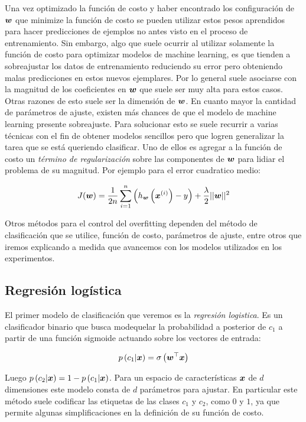 Una vez optimizado la función de costo y haber encontrado los configuración de
$\boldsymbol{w}$ que minimize la función de costo se pueden utilizar estos pesos
aprendidos para hacer predicciones de ejemplos no antes visto en el proceso de
entrenamiento. Sin embargo, algo que suele ocurrir al utilizar solamente la
función de costo para optimizar modelos de machine learning, es que tienden a
sobreajustar los datos de entrenamiento reduciendo su error pero obteniendo
malas predicciones en estos nuevos ejemplares. Por lo general suele asociarse
con la magnitud de los coeficientes en $\boldsymbol{w}$ que suele ser muy alta para
estos casos. Otras razones de esto suele ser la dimensión de $\boldsymbol{w}$. En
cuanto mayor la cantidad de parámetros de ajuste, existen más chances de que el
modelo de machine learning presente sobreajuste. Para solucionar esto se suele
recurrir a varias técnicas con el fin de obtener modelos sencillos pero que
logren generalizar la tarea que se está queriendo clasificar. Uno de ellos es
agregar a la función de costo un \emph{término de regularización} sobre las
componentes de $\boldsymbol{w}$ para lidiar el problema de su magnitud. Por ejemplo para
el error cuadratico medio:

\begin{align}
    J(\boldsymbol{w}) = \frac{1}{2n} \sum_{i=1}^{n}\left( h_{\boldsymbol{w}}\left( \boldsymbol{x}^{(i)}\right) - y \right) +
                  \frac{\lambda}{2} ||\boldsymbol{w}||^{2}
\end{align}

Otros métodos para el control del overfitting dependen del método de
clasificación que se utilice, función de costo, parámetros de ajuste, entre
otros que iremos explicando a medida que avancemos con los modelos utilizados en
los experimentos.

\subsection{Regresión logística}

El primer modelo de clasificación que veremos es la \emph{regresión logistica}. Es un
clasificador binario que busca modequelar la probabilidad a posterior de $c_1$ a
partir de una función sigmoide actuando sobre los vectores de
entrada:

\begin{align}
    p\left( c_1 | \boldsymbol{x} \right) = \sigma\left( \boldsymbol{w}^{\top} \boldsymbol{x} \right)
\end{align}

Luego $p\left( c_2 | \boldsymbol{x} \right) = 1 - p\left( c_1 | \boldsymbol{x} \right)$.
Para un espacio de características $\boldsymbol{x}$ de $d$ dimensiones este modelo
consta de $d$ parámetros para ajustar. En particular este método suele codificar
las etiquetas de las clases $c_1$ y $c_2$, como $0$ y $1$, ya que permite
algunas simplificaciones en la definición de su función de costo.

